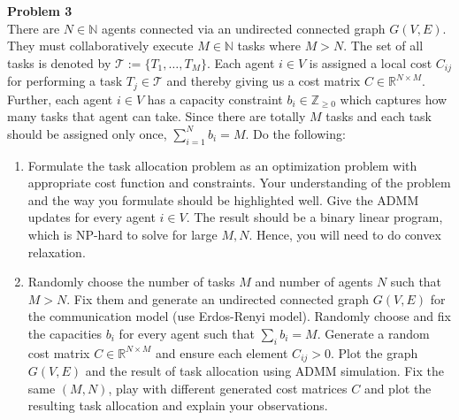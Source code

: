 \documentclass[a4paper,11pt]{article}
\newenvironment{problem}[1]
    {\begin{mdframed}[backgroundcolor=gray!20]\textbf{Problem #1}\\}
    {\end{mdframed}}
\newcommand{\R}{\mathbb{R}}
\newcommand{\N}{\mathbb{N}}
\begin{document}
\clearpage
\begin{problem}{3}
There are $N\in\N$ agents connected via an undirected connected graph $G(V,E)$. They must
collaboratively execute $M\in\N$ tasks where $M>N$. The set of all tasks is denoted by
$\mathcal T:=\{T_1,\ldots,T_M\}$. Each agent $i\in V$ is assigned a local cost $C_{ij}$ for
performing a task $T_j\in\mathcal T$ and thereby giving us a cost matrix $C\in\R^{N\times M}$.
Further, each agent $i\in V$ has a capacity constraint $b_i\in\mathbb Z_{\ge0}$ which captures
how many tasks that agent can take. Since there are totally $M$ tasks and each task should be
assigned only once, $\sum_{i=1}^N b_i=M$. Do the following:
\begin{enumerate}
\item Formulate the task allocation problem as an optimization problem with appropriate cost
function and constraints. Your understanding of the problem and the way you formulate should be
highlighted well. Give the ADMM updates for every agent $i\in V$. The result should be a binary
linear program, which is NP-hard to solve for large $M,N$. Hence, you will need to do convex
relaxation.
\item Randomly choose the number of tasks $M$ and number of agents $N$ such that $M>N$. Fix them
and generate an undirected connected graph $G(V,E)$ for the communication model (use Erdos-Renyi
model). Randomly choose and fix the capacities $b_i$ for every agent such that $\sum_i b_i=M$.
Generate a random cost matrix $C\in\R^{N\times M}$ and ensure each element $C_{ij}>0$. Plot the
graph $G(V,E)$ and the result of task allocation using ADMM simulation. Fix the same $(M,N)$,
play with different generated cost matrices $C$ and plot the resulting task allocation and explain
your observations.
\end{enumerate}
\end{problem}
\end{document}
